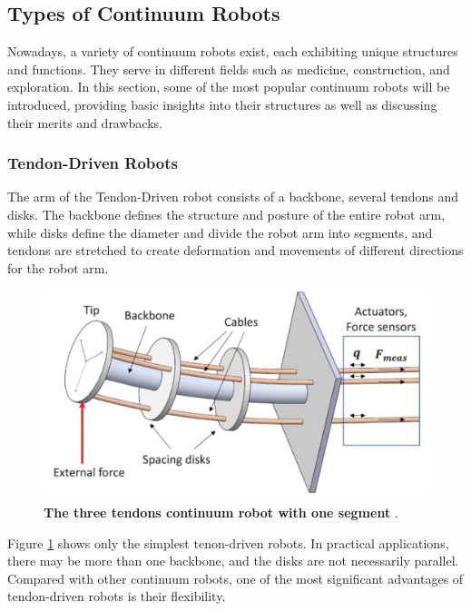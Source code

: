 \subsection{Types of Continuum Robots}
Nowadays, a variety of continuum robots exist, each exhibiting unique structures and functions. They serve in different fields 
such as medicine, construction, and exploration. In this section, some of the most popular continuum robots will be introduced, 
providing basic insights into their structures as well as discussing their merits and drawbacks. \\
\subsubsection{Tendon-Driven Robots}
The arm of the Tendon-Driven robot consists of a backbone, several tendons and disks. The backbone defines the structure and 
posture of the entire robot arm, while disks define the diameter and divide the robot arm into segments, and tendons are 
stretched to create deformation and movements of different directions for the robot arm. \\
\begin{figure}[H] %
    \centering %
    \captionsetup{labelsep=colon}
    \includegraphics[width=.9\textwidth]{Image/LR/3tendon_1segment_CR.PNG} 
    \caption[The three tendons continuum robot with one segment]
    {\centering \textbf{The three tendons continuum robot with one segment} \cite{3tendon_1segment_CR}.}
    \label{fig:3tendon_1segment_CR}
\end{figure}
\noindent Figure \ref{fig:3tendon_1segment_CR} shows only the simplest tenon-driven robots. In practical applications, there 
may be more than one backbone, and the disks are not necessarily parallel. \\
Compared with other continuum robots, one of the most significant advantages of tendon-driven robots is their flexibility. 
